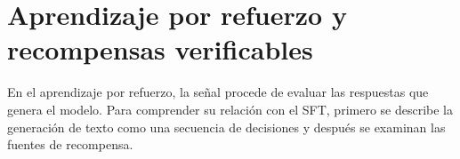 \section{Aprendizaje por refuerzo y recompensas verificables}
\label{sec:marco-rl}
En el aprendizaje por refuerzo, la señal procede de evaluar las respuestas que genera el modelo. Para comprender su relación con el SFT, primero se describe la generación de texto como una secuencia de decisiones y después se examinan las fuentes de recompensa.

%
%
%

